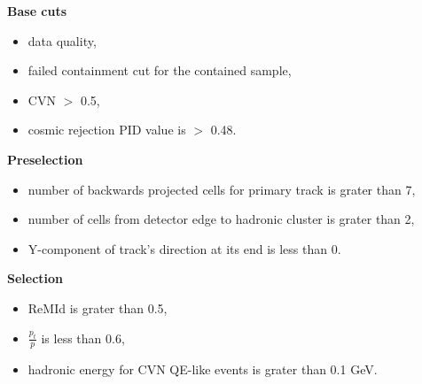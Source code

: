 \textbf{Base cuts}
\begin{itemize}
\item data quality,
\item failed containment cut for the contained sample,
\item CVN $>$ 0.5,
\item cosmic rejection PID value is $>$ 0.48.
\end{itemize}

\textbf{Preselection}
\begin{itemize}
\item number of backwards projected cells for primary track is grater than 7,
\item number of cells from detector edge to hadronic cluster is grater than 2,
\item Y-component of track's direction at its end is less than 0.
\end{itemize}

\textbf{Selection}
\begin{itemize}
\item ReMId is grater than 0.5,
\item $\frac{p_t}{p}$ is less than 0.6,
\item hadronic energy for CVN QE-like events is grater than 0.1 GeV.
\end{itemize}
